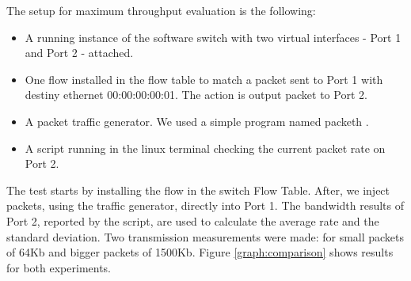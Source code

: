     The setup for maximum throughput evaluation is the following:
    
    \begin{itemize}
    \item A running instance of the software switch with two virtual interfaces - Port 1 and Port 2 - attached. 
    \item One flow installed in the flow table to match a packet sent to Port 1 with destiny ethernet 00:00:00:00:01. The action is output packet to Port 2. 
    \item A packet traffic generator. We used a simple program named packeth \cite{packeth}.
    \item A script running in the linux terminal checking the current packet rate on Port 2.   
    \end{itemize}
    
    The test starts by installing the flow in the switch Flow Table. After, we inject packets, using the traffic generator, directly into Port 1. The bandwidth results of Port 2, reported by the script, are used to calculate the average rate and the standard deviation.  
    Two transmission measurements were made: for small packets of 64Kb and bigger packets of 1500Kb. Figure \ref{graph:comparison} shows results for both experiments.

